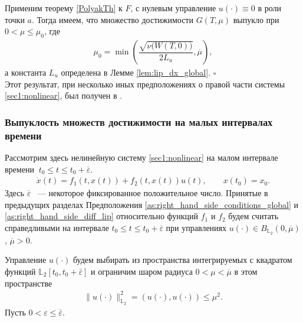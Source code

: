 \documentclass[../main.tex]{subfiles}
\begin{document}
	Применим теорему \ref{PolyakTh} к $F$, с нулевым управление $u(\cdot) \equiv 0$ в роли точки $a$. 
	Тогда имеем, что множество достижимости $G(T,\mu)$ выпукло при $ 0 < \mu \leqslant \mu_0 $, где  
	\begin{gather}\label{sec1:mu0}
		\mu_0 = \min\left( \dfrac{\sqrt{\nu\big(W(T,0)\big)}}{2L_u}, \overline{\mu} \right), 
	\end{gather}
	а константа $L_u $ определена в Лемме  \ref{lem:lip_dx_global}. 
	\hfill$\square$\\[1ex]%
	Этот результат, при несколько иных предположениях о правой части системы \eqref{sec1:nonlinear}, был получен в \cite{Polyak2004}.
	
    \subsubsection{Выпуклость множеств достижимости на малых интервалах времени}
    Рассмотрим здесь нелинейную систему \eqref{sec1:nonlinear} на малом интервале времени $\ t_0 \leqslant t \leqslant t_0 + \overline{\varepsilon} $.
    \begin{gather}\label{nonlinearT}
			\dot{x}(t)=f_1(t,x(t))+f_2(t,x(t))u(t), \qquad x(t_0) = x_0.
	\end{gather}
    Здесь $ \overline{\varepsilon} $ ~--- некоторое фиксированное положительное число. Принятые в предыдущих разделах Предположения \ref{as:right_hand_side_conditions_global} и \ref{as:right_hand_side_diff_lip} относительно функций $f_1$ и $f_2$ будем считать справедливыми на интервале $t_0 \leqslant t \leqslant t_0 + \overline{\varepsilon} $ при управлениях $u(\cdot) \in B_{\mathbb{L}_2}(0, \overline{\mu}) $, $\overline{\mu} > 0$.
   

     Управление $u(\cdot)$ будем выбирать из
    пространства интегрируемых с квадратом функций $\mathbb{L}_2[t_0,t_0+\bar{\varepsilon}]$ и ограничим шаром радиуса $  0 < \mu < \overline{\mu} $ в этом пространстве
    \begin{gather*}
    	\lVert u(\cdot)\rVert^2_{\mathbb{L}_2} = \left(u(\cdot),u(\cdot) \right) \leqslant \mu^2.
    \end{gather*}
	Пусть $ 0 <  \varepsilon \leqslant \bar{\varepsilon} $.  
	
\end{document}
